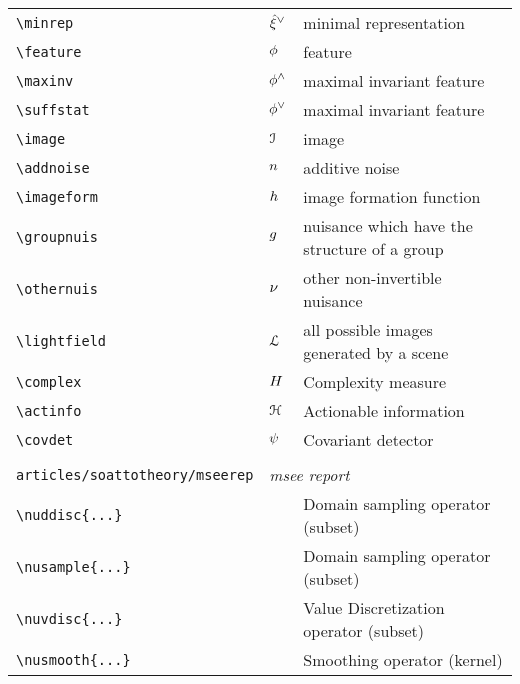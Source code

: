 \begin{longtable}{lll}
 {\color[rgb]{0.5,0.5,0.5}\texttt{\textbackslash minrep}} & ${\hat{\xi}}^{\vee}$ &  minimal representation\\ 
 {\color[rgb]{0.5,0.5,0.5}\texttt{\textbackslash feature}} & $\phi$ &  feature\\ 
 {\color[rgb]{0.5,0.5,0.5}\texttt{\textbackslash maxinv}} & $\phi^{\wedge}$ &  maximal invariant feature\\ 
 {\color[rgb]{0.5,0.5,0.5}\texttt{\textbackslash suffstat}} & $\phi^{\vee}$ &  maximal invariant feature\\ 
 {\color[rgb]{0.5,0.5,0.5}\texttt{\textbackslash image}} & $\mathcal{I}$ &  image\\ 
 {\color[rgb]{0.5,0.5,0.5}\texttt{\textbackslash addnoise}} & $n$ &  additive noise\\ 
 {\color[rgb]{0.5,0.5,0.5}\texttt{\textbackslash imageform}} & $h$ &  image formation function\\ 
 {\color[rgb]{0.5,0.5,0.5}\texttt{\textbackslash groupnuis}} & $g$ &  nuisance which have the structure of a group\\ 
 {\color[rgb]{0.5,0.5,0.5}\texttt{\textbackslash othernuis}} & $\nu$ &  other non-invertible nuisance\\ 
 {\color[rgb]{0.5,0.5,0.5}\texttt{\textbackslash lightfield}} & $\mathcal{L}$ &  all possible images generated by a scene\\ 
 {\color[rgb]{0.5,0.5,0.5}\texttt{\textbackslash complex}} & $H$ &  Complexity measure\\ 
 {\color[rgb]{0.5,0.5,0.5}\texttt{\textbackslash actinfo}} & $\mathcal{H}$ &  Actionable information\\ 
 {\color[rgb]{0.5,0.5,0.5}\texttt{\textbackslash covdet}} & $\psi$ &  Covariant detector\\ 
  &  & \\ 
 {\color[rgb]{0.5,0.5,0.5}\texttt{articles/soattotheory/mseerep}} & \multicolumn{2}{l}{\emph{msee report}}\\ 
 \hline
{\color[rgb]{0.5,0.5,0.5}\texttt{\textbackslash nuddisc\{...\}}} &  &  Domain sampling operator (subset)\\ 
 {\color[rgb]{0.5,0.5,0.5}\texttt{\textbackslash nusample\{...\}}} &  &  Domain sampling operator (subset)\\ 
 {\color[rgb]{0.5,0.5,0.5}\texttt{\textbackslash nuvdisc\{...\}}} &  &  Value Discretization operator (subset)\\ 
 {\color[rgb]{0.5,0.5,0.5}\texttt{\textbackslash nusmooth\{...\}}} &  &  Smoothing operator (kernel)\\ 

\end{longtable}
